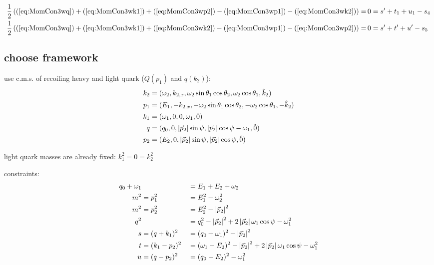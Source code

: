 \begin{align}
\frac 1 2 \left((\ref{eq:MomCon3wq}) + (\ref{eq:MomCon3wk1}) + (\ref{eq:MomCon3wp2}) - (\ref{eq:MomCon3wp1}) - (\ref{eq:MomCon3wk2})\right)=&\,0= s' + t_1 + u_1 - s_4\\
\frac 1 2 \left((\ref{eq:MomCon3wq}) + (\ref{eq:MomCon3wk1}) + (\ref{eq:MomCon3wk2}) - (\ref{eq:MomCon3wp1}) - (\ref{eq:MomCon3wp2})\right)=&\,0= s' + t' + u' - s_5 \label{eq:MonCon3s5up}
\end{align}

\subsection{choose framework}
use c.m.s. of recoiling heavy and light quark ($Q(p_1)$ and $q(k_2)$):
\begin{align}
k_2 &= (\omega_2,k_{2,x},\omega_2\sin\theta_1\cos\theta_2,\omega_2\cos\theta_1, \hat k_2)\\
p_1 &= (E_1,-k_{2,x},-\omega_2\sin\theta_1\cos\theta_2,-\omega_2\cos\theta_1, -\hat k_2)\\
k_1 &= (\omega_1,0,0,\omega_1, \hat 0)\\
q &= (q_0,0,\left|\vec p_2\right|\sin\psi,\left|\vec p_2\right|\cos\psi-\omega_1, \hat 0)\\
p_2 &= (E_2,0,\left|\vec p_2\right|\sin\psi,\left|\vec p_2\right|\cos\psi, \hat 0)
\end{align}

light quark masses are already fixed: $k_1^2 = 0 = k_2^2$

constraints:
\begin{align}
q_0+\omega_1 & &&=E_1+E_2+\omega_2 \label{eq:PSConMomCon}\\
m^2 &= p_1^2 &&= E_1^2 - \omega_2^2 \label{eq:PSConp1}\\
m^2 &= p_2^2 &&= E_2^2 - \left|\vec p_2\right|^2 \label{eq:PSConp2} \\
q^2 & &&= q_0^2 - \left|\vec p_2\right|^2 + 2\left|\vec p_2\right|\omega_1\cos\psi-\omega_1^2 \label{eq:PSConq}\\
s &= (q+k_1)^2 &&= (q_0+\omega_1)^2 - \left|\vec p_2\right|^2 \label{eq:PSCons}\\
t &= (k_1-p_2)^2 &&= (\omega_1-E_2)^2-\left|\vec p_2\right|^2+2\left|\vec p_2\right|\omega_1\cos\psi-\omega_1^2 \label{eq:PSCont}\\
u &= (q-p_2)^2 &&= (q_0-E_2)^2 - \omega_1^2 \label{eq:PSConu}
\end{align}

